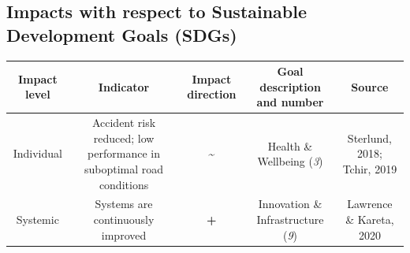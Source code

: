 \documentclass[
]{book}
\begin{document}
\hypertarget{impacts-with-respect-to-sustainable-development-goals-sdgs-19}{%
\subsection*{Impacts with respect to Sustainable Development Goals (SDGs)}\label{impacts-with-respect-to-sustainable-development-goals-sdgs-19}}

\begin{longtable}[]{@{}ccccc@{}}
\toprule
\begin{minipage}[b]{0.17\columnwidth}\centering
Impact level\strut
\end{minipage} & \begin{minipage}[b]{0.16\columnwidth}\centering
Indicator\strut
\end{minipage} & \begin{minipage}[b]{0.17\columnwidth}\centering
Impact direction\strut
\end{minipage} & \begin{minipage}[b]{0.17\columnwidth}\centering
Goal description and number\strut
\end{minipage} & \begin{minipage}[b]{0.17\columnwidth}\centering
Source\strut
\end{minipage}\tabularnewline
\midrule
\endhead
\begin{minipage}[t]{0.17\columnwidth}\centering
Individual\strut
\end{minipage} & \begin{minipage}[t]{0.16\columnwidth}\centering
Accident risk reduced; low performance in suboptimal road conditions\strut
\end{minipage} & \begin{minipage}[t]{0.17\columnwidth}\centering
\textbf{\textasciitilde{}}\strut
\end{minipage} & \begin{minipage}[t]{0.17\columnwidth}\centering
Health \& Wellbeing (\emph{3})\strut
\end{minipage} & \begin{minipage}[t]{0.17\columnwidth}\centering
Sterlund, 2018; Tchir, 2019\strut
\end{minipage}\tabularnewline
\begin{minipage}[t]{0.17\columnwidth}\centering
Systemic\strut
\end{minipage} & \begin{minipage}[t]{0.16\columnwidth}\centering
Systems are continuously improved\strut
\end{minipage} & \begin{minipage}[t]{0.17\columnwidth}\centering
\textbf{+}\strut
\end{minipage} & \begin{minipage}[t]{0.17\columnwidth}\centering
Innovation \& Infrastructure (\emph{9})\strut
\end{minipage} & \begin{minipage}[t]{0.17\columnwidth}\centering
Lawrence \& Kareta, 2020\strut
\end{minipage}\tabularnewline
\bottomrule
\end{longtable}
\end{document}
